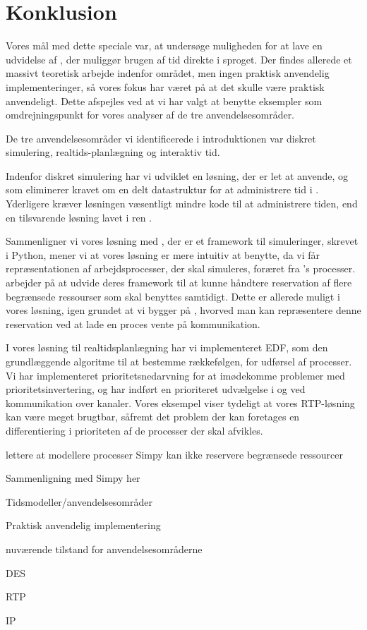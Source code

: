 \chapter{Konklusion} 
\label{chap:konklusion}

Vores mål med dette speciale var, at undersøge muligheden for at lave en udvidelse af \pycsp, der muliggør brugen af tid direkte i sproget. Der findes allerede et massivt teoretisk arbejde indenfor området, men ingen praktisk anvendelig implementeringer, så vores fokus har været på at det skulle være praktisk anvendeligt. Dette afspejles ved at vi har valgt at benytte eksempler som omdrejningspunkt for vores analyser af de tre anvendelsesområder. 

De tre anvendelsesområder vi identificerede i introduktionen var diskret simulering, realtids-planlægning og interaktiv tid. 

Indenfor diskret simulering har vi udviklet en løsning, der er let at anvende, og som eliminerer kravet om en delt datastruktur for at administrere tid i \pycsp. Yderligere kræver løsningen væsentligt mindre kode til at administrere tiden, end en tilsvarende løsning lavet i ren \pycsp. 

Sammenligner vi vores løsning med \simpy, der er et framework til simuleringer, skrevet i Python, mener vi at vores løsning er mere intuitiv at benytte, da vi får repræsentationen af arbejdsprocesser, der skal simuleres, foræret fra \pycsp 's processer. \simpy arbejder på at udvide deres framework til at kunne håndtere reservation af flere begrænsede ressourser som skal benyttes samtidigt. Dette er allerede muligt i vores løsning, igen grundet at vi bygger på \pycsp, hvorved man kan repræsentere denne reservation ved at lade en proces vente på kommunikation. 

I vores løsning til realtidsplanlægning har vi implementeret EDF, som den grundlæggende algoritme til at bestemme rækkefølgen, for udførsel af processer. Vi har implementeret prioritetsnedarvning for at imødekomme problemer med prioritetsinvertering, og har indført en prioriteret udvælgelse i  og ved kommunikation over kanaler. Vores eksempel viser tydeligt at vores RTP-løsning kan være meget brugtbar, såfremt det problem der kan foretages en differentiering i prioriteten af de processer der skal afvikles. 





lettere at modellere processer
Simpy kan ikke reservere begrænsede ressourcer



Sammenligning med Simpy her 





Tidsmodeller/anvendelsesområder


Praktisk anvendelig implementering


nuværende tilstand for anvendelsesområderne

DES



RTP



IP



